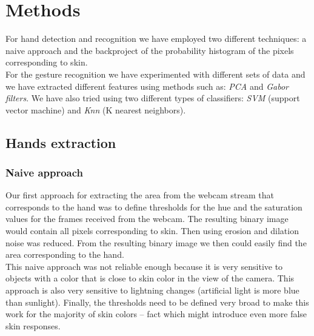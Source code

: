 \documentclass[a4paper, 11pt, twocolumn]{article}
\begin{document}
    \section{Methods}
	\label{sec:methods}
		For hand detection and recognition we have employed two different techniques: a naive approach and the backproject of the probability histogram of the pixels corresponding to skin.\\
		\hspace*{10px}For the gesture recognition we have experimented with different sets of data and we have extracted different features using methods such as: \emph{PCA} and \emph{Gabor filters}. We have also tried using two different types of classifiers: \emph{SVM} (support vector machine) and \emph{Knn} (K nearest neighbors).
        \subsection{Hands extraction}
		\label{sec:Meth_exrctHands}
        \subsubsection{Naive approach}
		 Our first approach for extracting the area from the webcam stream that corresponds to the hand was to define thresholds for the hue and the saturation values for the frames received from the webcam. The resulting binary image would contain all pixels corresponding to skin. Then using erosion and dilation noise was reduced. From the resulting binary image we then could easily find the area corresponding to the hand.\\
       	\hspace*{10px}This naive approach was not reliable enough because it is very sensitive to objects with a color that is close to skin color in the view of the camera. This approach is also very sensitive to lightning changes (artificial light is more blue than sunlight). Finally, the thresholds need to be defined very broad to make this work for the majority of skin colors -- fact which might introduce even more false skin responses.        
\end{document}
